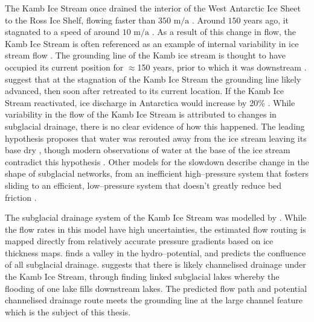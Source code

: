 The  Kamb Ice Stream  once  drained  the  interior  of  the  West  Antarctic  Ice  Sheet  to  the Ross Ice Shelf, flowing faster than $350$ $\mbox{m/a}$ \citep{ng2004fast}.  Around $150$ years ago, it stagnated to a speed of around $10$ $\mbox{m/a}$ \citep{ng2004fast}.   As  a  result  of  this  change  in  flow,  the  Kamb Ice Stream is  often referenced as an example of internal variability in ice stream flow \citep[e.g.][]{hulbe2004west}.  
The grounding line of the Kamb ice stream is thought to have occupied its current position for $\approx$150 years, prior to which it was downstream \citep{fried2014grounding}. \cite{horgan2017poststagnation} suggest that at the stagnation of the Kamb Ice Stream the grounding line likely advanced,  then soon after retreated to its current location.
If the Kamb Ice Stream reactivated, ice discharge in Antarctica would increase by 20\% \citep{jacobel2009spatial}. 
While variability in the flow of the Kamb Ice Stream is attributed to changes in subglacial drainage, there is no clear evidence of how this happened. The leading hypothesis proposes that water was rerouted  away  from  the  ice  stream  leaving  its  base  dry \citep[e.g.][]{anandakrishnan1997stagnation}, though modern observations of water at the base of the ice stream contradict this hypothesis \citep{engelhardt1997basal}.  Other models for the slowdown describe change in the shape of subglacial networks, from an inefficient high--pressure system that fosters sliding to an efficient, low--pressure system that doesn’t greatly reduce bed friction \citep{lelandais2018modelled,retzlaff1993timing}.

The subglacial drainage system of the Kamb Ice Stream was modelled by \cite{le2013evidence}. While the flow rates in this model have high uncertainties, the estimated flow routing is mapped directly from relatively accurate pressure gradients based on ice thickness maps. \cite{le2013evidence} finds a valley in the hydro--potential, and predicts the confluence of all subglacial drainage. \cite{kim2016active} suggests that there is likely channelised drainage under the Kamb Ice Stream, through finding linked subglacial lakes whereby the flooding of one lake fills downstream lakes.  The predicted flow path and potential channelised drainage route meets the grounding line at the large channel feature which is the subject of this thesis. 


